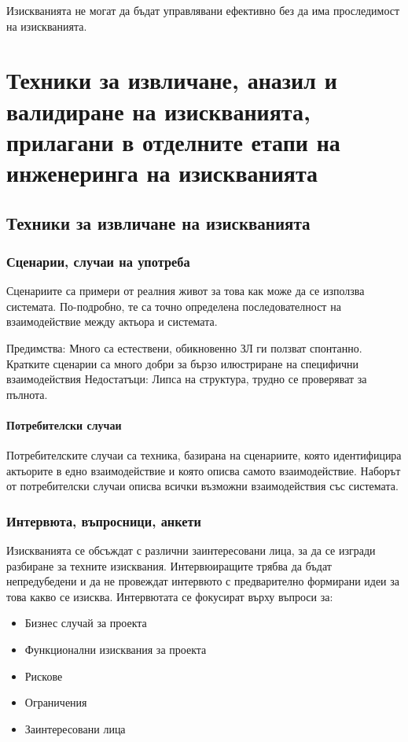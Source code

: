 \documentclass[fleqn,12pt]{article}
\begin{document}
Изискванията не могат да бъдат управлявани ефективно без да има проследимост на изискванията.

\section{Техники за извличане, аназил и валидиране на изискванията, прилагани в отделните етапи на инженеринга на изискванията}

\subsection{Техники за извличане на изискванията}

\subsubsection{Сценарии, случаи на употреба}
Сценариите са примери от реалния живот за това как може да се използва системата. По-подробно, те са точно определена последователност на взаимодействие между актьора и системата.

Предимства: Много са естествени, обикновенно ЗЛ ги ползват спонтанно. Кратките сценарии са много добри за бързо илюстриране на специфични взаимодействия
Недостатъци: Липса на структура, трудно се проверяват за пълнота.

\paragraph{Потребителски случаи}
Потребителските случаи са техника, базирана на сценариите, която идентифицира актьорите в едно взаимодействие и която описва самото взаимодействие. Наборът от потребителски случаи описва всички възможни взаимодействия със системата.

\subsubsection{Интервюта, въпросници, анкети}
Изискванията се обсъждат с различни заинтересовани лица, за да се изгради разбиране за техните изисквания. Интервюиращите трябва да бъдат непредубедени и да не провеждат интервюто с предварително формирани идеи за това какво се изисква. Интервютата се фокусират върху въпроси за:
\begin{itemize}
	\item Бизнес случай за проекта
	\item Функционални изисквания за проекта
	\item Рискове
	\item Ограничения
	\item Заинтересовани лица
\end{itemize}
\end{document}
